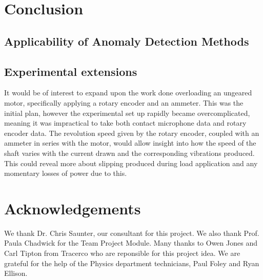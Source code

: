 \section{Conclusion}
\label{sec:conclusion}

\subsection{Applicability of Anomaly Detection Methods}

\subsection{Experimental extensions }

It would be of interest to expand upon the work done overloading an ungeared motor, specifically applying a rotary encoder and an ammeter. This was the initial plan, however the experimental set up rapidly became overcomplicated, meaning it was impractical to take both contact microphone data and rotary encoder data. The revolution speed given by the rotary encoder, coupled with an ammeter in series with the motor, would allow insight into how the speed of the shaft varies with the current drawn and the corresponding vibrations produced. This could reveal more about slipping produced during load application and any momentary losses of power due to this. 





\section*{Acknowledgements}

\small We thank Dr. Chris Saunter, our consultant for this project. We also thank Prof. Paula Chadwick for the Team Project Module. Many thanks to Owen Jones and Carl Tipton from Tracerco who are reponsible for this project idea. We are grateful for the help of the Physics department technicians, Paul Foley and Ryan Ellison.




















































